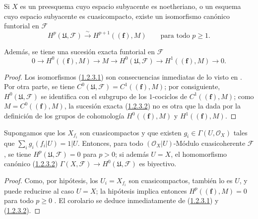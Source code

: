 \begin{proposition}[1.2.3]
\label{III.1.2.3}
\label{III.1.2.3-fr}
Si $X$ es un preesquema cuyo espacio subyacente es noetheriano, o un esquema cuyo espacio subyacente es cuasicompacto, existe un isomorfismo canónico funtorial en $\mathcal F$
\begin{equation}
\label{III.1.2.3.1-fr}
\tag{1.2.3.1}
H^p(\mathfrak U,\mathcal F)\xrightarrow{\sim}H^{p+1}((\mathbf f),M)
\qquad\text{para todo }p\geq1.
\end{equation}

Además, se tiene una sucesión exacta funtorial en $\mathcal F$
\begin{equation}
\label{III.1.2.3.2-fr}
\tag{1.2.3.2}
0\longrightarrow H^0((\mathbf f),M)\longrightarrow M
\longrightarrow H^0(\mathfrak U,\mathcal F)
\longrightarrow H^1((\mathbf f),M)\longrightarrow0.
\end{equation}
\end{proposition}

\begin{proof}
Los isomorfismos (\hyperref[III.1.2.3.1]{1.2.3.1}) son consecuencias inmediatas de lo visto en .
Por otra parte, se tiene $C^0(\mathfrak U,\mathcal F)=C^1((\mathbf f),M)$; por consiguiente, $H^0(\mathfrak U,\mathcal F)$ se identifica con el subgrupo de los $1$-cociclos de $C^1((\mathbf f),M)$; como $M=C^0((\mathbf f),M)$, la sucesión exacta (\hyperref[III.1.2.3.2]{1.2.3.2}) no es otra que la dada por la definición de los grupos de cohomología $H^0((\mathbf f),M)$ y $H^1((\mathbf f),M)$.
\end{proof}

\begin{corollary}[1.2.4]
\label{III.1.2.4}
\label{III.1.2.4-fr}
Supongamos que los $X_{f_i}$ son cuasicompactos y que existen $g_i\in\Gamma(U,\mathcal O_X)$ tales que
$\sum_i g_i(f_i\vert U)=1\vert U$. Entonces, para todo
$(\mathcal O_X\vert U)$-Módulo cuasicoherente $\mathcal F$, se tiene $H^p(\mathfrak U,\mathcal F)=0$ para $p>0$; si además $U=X$, el homomorfismo canónico \textup{(\hyperref[III.1.2.3.2]{1.2.3.2})} $\Gamma(X,\mathcal F)\to H^0(\mathfrak U,\mathcal F)$ es biyectivo.
\end{corollary}

\begin{proof}
Como, por hipótesis, los $U_i=X_{f_i}$ son cuasicompactos, también lo es $U$, y puede reducirse al caso $U=X$; la hipótesis implica entonces
$H^p((\mathbf f),M)=0$ para todo $p\geq0$ .
El corolario se deduce inmediatamente de (\hyperref[III.1.2.3.1]{1.2.3.1}) y (\hyperref[III.1.2.3.2]{1.2.3.2}).
\end{proof}

